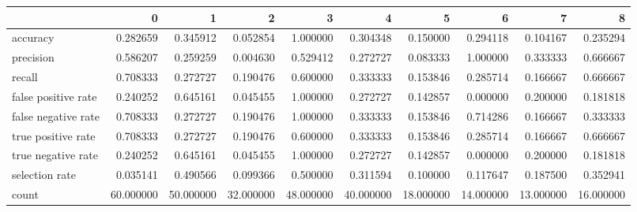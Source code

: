 \begin{tabular}{lrrrrrrrrr}
\toprule
{} &          0 &          1 &          2 &          3 &          4 &          5 &          6 &          7 &          8 \\
\midrule
accuracy            &   0.282659 &   0.345912 &   0.052854 &   1.000000 &   0.304348 &   0.150000 &   0.294118 &   0.104167 &   0.235294 \\
precision           &   0.586207 &   0.259259 &   0.004630 &   0.529412 &   0.272727 &   0.083333 &   1.000000 &   0.333333 &   0.666667 \\
recall              &   0.708333 &   0.272727 &   0.190476 &   0.600000 &   0.333333 &   0.153846 &   0.285714 &   0.166667 &   0.666667 \\
false positive rate &   0.240252 &   0.645161 &   0.045455 &   1.000000 &   0.272727 &   0.142857 &   0.000000 &   0.200000 &   0.181818 \\
false negative rate &   0.708333 &   0.272727 &   0.190476 &   1.000000 &   0.333333 &   0.153846 &   0.714286 &   0.166667 &   0.333333 \\
true positive rate  &   0.708333 &   0.272727 &   0.190476 &   0.600000 &   0.333333 &   0.153846 &   0.285714 &   0.166667 &   0.666667 \\
true negative rate  &   0.240252 &   0.645161 &   0.045455 &   1.000000 &   0.272727 &   0.142857 &   0.000000 &   0.200000 &   0.181818 \\
selection rate      &   0.035141 &   0.490566 &   0.099366 &   0.500000 &   0.311594 &   0.100000 &   0.117647 &   0.187500 &   0.352941 \\
count               &  60.000000 &  50.000000 &  32.000000 &  48.000000 &  40.000000 &  18.000000 &  14.000000 &  13.000000 &  16.000000 \\
\bottomrule
\end{tabular}
